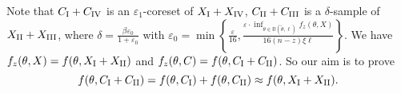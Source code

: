 Note that $ C_\mathrm{\Rnum{1}}+C_\mathrm{\Rnum{4}} $ is an $ \varepsilon_1 $-coreset of $ X_\mathrm{\Rnum{1}}+X_\mathrm{\Rnum{4}} $, $ C_\mathrm{\Rnum{2}}+C_\mathrm{\Rnum{3}} $ is a $ \delta $-sample of $ X_\mathrm{\Rnum{2}}+X_\mathrm{\Rnum{3}} $, where $ \delta=\frac{\beta\varepsilon_0}{1+\varepsilon_0} $ with $ \varepsilon_0=\min \left\{ \frac{\varepsilon}{16},\frac{\varepsilon\cdot\inf_{\theta\in\mathbb{B}(\tilde{\theta}, \ell)} f_z(\theta,X)}{16(n-z)\xi{\ell}} \right\} $. We have $ f_z(\theta,X)=f(\theta,X_\mathrm{\Rnum{1}}+X_\mathrm{\Rnum{2}}) $ and $ f_z(\theta,C)=f(\theta,C_\mathrm{\Rnum{1}}+C_\mathrm{\Rnum{2}}) $. So our aim is to prove
\[f(\theta,C_\mathrm{\Rnum{1}}+C_\mathrm{\Rnum{2}})=f(\theta,C_\mathrm{\Rnum{1}})+f(\theta,C_\mathrm{\Rnum{2}})\approx f(\theta,X_\mathrm{\Rnum{1}}+X_\mathrm{\Rnum{2}}).\]
